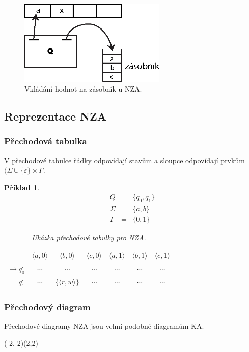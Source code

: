 \documentclass[10pt, a4paper, titlepage]{article}
\theoremstyle{note}
\newtheorem{priklad}{Příklad}
\begin{document}
\begin{figure}[ht]
\centering\includegraphics[width=7cm]{zasobnikovy-2.eps}
\caption{Vkládání hodnot na zásobník u NZA.}
\end{figure}

\subsection{Reprezentace NZA}

\subsubsection{Přechodová tabulka}
V přechodové tabulce řádky odpovídají stavům a sloupce odpovídají prvkům $(\Sigma \cup \lbrace \varepsilon \rbrace \times \Gamma$.
\begin{priklad}
\begin{eqnarray*}
Q &=& \lbrace q_0, q_1 \rbrace \\
\Sigma &=& \lbrace a, b \rbrace \\
\Gamma &=& \lbrace 0, 1 \rbrace
\end{eqnarray*}
\begin{table}[h]
\begin{center}
\begin{tabular}{ r || c | c | c | c | c | c}                   
 & $\langle a, 0 \rangle$ & $\langle b, 0 \rangle$ & $\langle c, 0 \rangle$ & $\langle a, 1 \rangle$ & $\langle b, 1 \rangle$ & $\langle c, 1 \rangle$ \\
\hline
$\rightarrow q_0^{\cdot}$ & $\cdots$ & $\cdots$ & $\cdots$ & $\cdots$ & $\cdots$ & $\cdots$ \\
$q_1^{\cdot}$ & $\cdots$ & $\lbrace \langle r, w \rangle \rbrace$ & $\cdots$ & $\cdots$ & $\cdots$ & $\cdots$
\end{tabular}
\end{center}
\caption{Ukázka přechodové tabulky pro NZA.}
\end{table}
\end{priklad}

\subsubsection{Přechodový diagram}
Přechodov\'e diagramy NZA jsou velmi podobn\'e diagramům KA.
\begin{center}
\begin{VCPicture}{(-2,-2)(2,2)}
\end{VCPicture}
\end{center}
\end{document}

